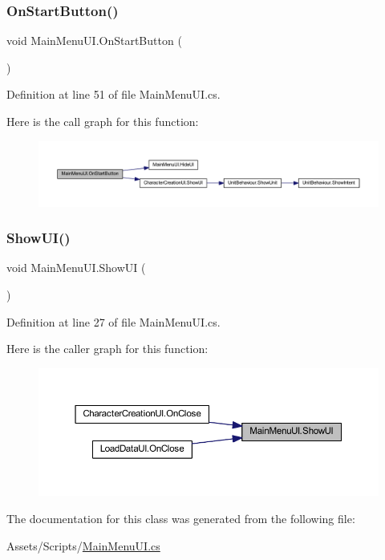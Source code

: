 \subsubsection{\texorpdfstring{OnStartButton()}{OnStartButton()}}
{\footnotesize\ttfamily void Main\+Menu\+U\+I.\+On\+Start\+Button (\begin{DoxyParamCaption}{ }\end{DoxyParamCaption})}



Definition at line 51 of file Main\+Menu\+U\+I.\+cs.

Here is the call graph for this function\+:
\nopagebreak
\begin{figure}[H]
\begin{center}
\leavevmode
\includegraphics[width=350pt]{class_main_menu_u_i_ac567ba394028f00989750f4782325daf_cgraph}
\end{center}
\end{figure}
\mbox{\label{class_main_menu_u_i_ab70d817a22e65d2258cfd0d9a48404a8}} 
\subsubsection{\texorpdfstring{ShowUI()}{ShowUI()}}
{\footnotesize\ttfamily void Main\+Menu\+U\+I.\+Show\+UI (\begin{DoxyParamCaption}{ }\end{DoxyParamCaption})}



Definition at line 27 of file Main\+Menu\+U\+I.\+cs.

Here is the caller graph for this function\+:
\nopagebreak
\begin{figure}[H]
\begin{center}
\leavevmode
\includegraphics[width=350pt]{class_main_menu_u_i_ab70d817a22e65d2258cfd0d9a48404a8_icgraph}
\end{center}
\end{figure}


The documentation for this class was generated from the following file\+:\begin{DoxyCompactItemize}
\item 
Assets/\+Scripts/\mbox{\hyperlink{_main_menu_u_i_8cs}{Main\+Menu\+U\+I.\+cs}}\end{DoxyCompactItemize}
